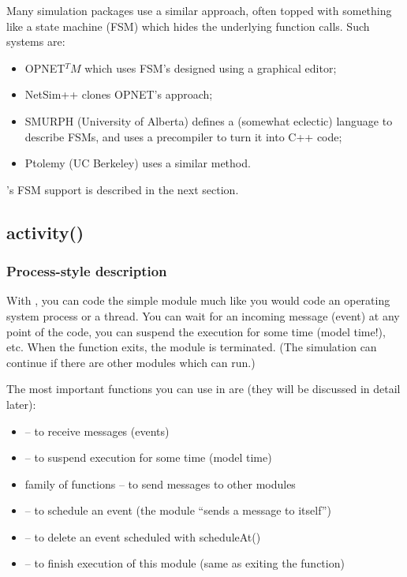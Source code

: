Many simulation packages use a similar approach, often topped with
something like a state machine
(FSM) which hides the underlying function calls. Such
systems are:
\begin{itemize}
  \item{OPNET$^TM$ which uses FSM's designed using a graphical editor;}
  \item{NetSim++ clones OPNET's approach;}
  \item{SMURPH (University of Alberta) defines a (somewhat eclectic)
      language to describe FSMs, and uses a precompiler to turn it
      into C++ code;}
  \item{Ptolemy (UC Berkeley) uses a similar method.}
\end{itemize}

{\opp}'s FSM support is described in the next section.



\subsection{activity()}
\label{sec:simple-modules:activity}

\subsubsection{Process-style description}

With , you can code the simple
module much like you would code an operating system process or a
thread. You can wait for an incoming message (event) at any point of
the code, you can suspend the execution for some time (model time!),
etc. When the  function exits, the module is
terminated.  (The simulation can continue if there are other modules
which can run.)


The most important functions you can use in  are
(they will be discussed in detail later):
\begin{itemize}
\item{ -- to receive messages (events)}
\item{ -- to suspend execution
    for some time (model time)}
\item{ family of functions -- to send messages to other
    modules}
\item{ -- to schedule an event (the module ``sends
    a message to itself'')}
\item{ -- to delete an event scheduled with
    scheduleAt()}
\item{ -- to finish execution of this module (same as
    exiting the  function)}
\end{itemize}

